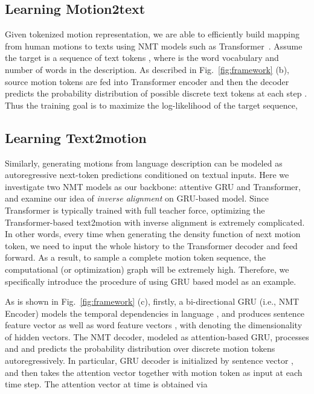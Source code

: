 \documentclass[runningheads]{llncs}
\newcommand{\beforesubsection}{\vspace{-2mm}}
\newcommand{\aftersubsection}{\vspace{-2mm}}
\begin{document}
\beforesubsection
\subsection{Learning Motion2text}
\aftersubsection
\label{app: motion-to-text}
Given tokenized motion representation, we are able to efficiently build mapping from human motions to texts using NMT models such as Transformer~\cite{vaswani2017attention}. Assume the target is a sequence of text tokens , where  is the word vocabulary and  number of words in the description. As described in Fig.~\ref{fig:framework} (b), source motion tokens are fed into Transformer encoder and then the decoder predicts the probability distribution of possible discrete text tokens at each step . Thus the training goal is to maximize the log-likelihood of the target sequence,


\beforesubsection
\subsection{Learning Text2motion}
\aftersubsection
\label{app:text-to-motion}

Similarly, generating motions from language description can be modeled as autoregressive next-token predictions conditioned on textual inputs. Here we investigate two NMT models as our backbone: attentive GRU and Transformer, and examine our idea of \textit{inverse alignment} on GRU-based model. Since Transformer is typically trained with full teacher force, optimizing the Transformer-based text2motion with inverse alignment is extremely complicated. In other words, every time when generating the density function of next motion token, we need to input the whole history to the Transformer decoder and feed forward. As a result, to sample a complete motion token sequence, the computational (or optimization) graph will be extremely high. Therefore, we specifically introduce the procedure of using GRU based model as an example.

As is shown in Fig.~\ref{fig:framework} (c), firstly, a bi-directional GRU (i.e., NMT Encoder) models the temporal dependencies in language , and produces sentence feature vector  as well as word feature vectors , with  denoting the dimensionality of hidden vectors. The NMT decoder, modeled as attention-based GRU, processes  and  and predicts the probability distribution over discrete motion tokens  autoregressively. In particular, GRU decoder is initialized by sentence vector , and then takes the attention vector  together with motion token as input at each time step. The attention vector  at time  is obtained via
\end{document}
